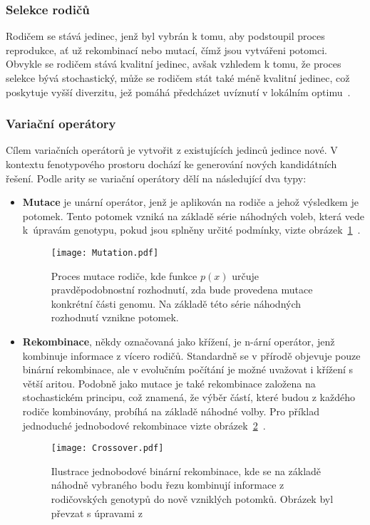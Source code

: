 \subsubsection*{Selekce rodičů}
Rodičem se stává jedinec, jenž byl vybrán k tomu, aby podstoupil proces reprodukce, ať už rekombinací nebo mutací, čímž jsou vytvářeni potomci. 
Obvykle se rodičem stává kvalitní jedinec, avšak vzhledem k tomu, že proces selekce bývá stochastický, může se rodičem stát také méně kvalitní jedinec, což poskytuje vyšší diverzitu, jež pomáhá předcházet uvíznutí v lokálním optimu~\cite{IntroductionToEvoComputing}. 

\subsubsection*{Variační operátory}
Cílem variačních operátorů je vytvořit z existujících jedinců jedince nové. 
V kontextu fenotypového prostoru dochází ke generování nových kandidátních řešení. 
Podle arity se variační operátory dělí na následující dva typy:
\begin{itemize}
    \item \textbf{Mutace} je unární operátor, jenž je aplikován na rodiče a jehož výsledkem je potomek. 
        Tento potomek vzniká na základě série náhodných voleb, která vede k~úpravám genotypu, pokud jsou splněny určité podmínky, vizte obrázek~\ref{fig:mutation}~\cite{IntroductionToEvoComputing,NaturalComputing}. 
        \begin{figure}[ht!]
            \centering
            \texttt{[image: Mutation.pdf]}
            \caption{Proces mutace rodiče, kde funkce $p\left(x\right)$ určuje pravděpodobnostní rozhodnutí, zda bude provedena mutace konkrétní části genomu. Na základě této série náhodných rozhodnutí vznikne potomek.}
            \label{fig:mutation}
        \end{figure}
    \item \textbf{Rekombinace}, někdy označovaná jako křížení, je n-ární operátor, jenž kombinuje informace z vícero rodičů. 
        Standardně se v přírodě objevuje pouze binární rekombinace, ale v evolučním počítání je možné uvažovat i křížení s větší aritou. 
        Podobně jako mutace je také rekombinace založena na stochastickém principu, což znamená, že výběr částí, které budou z každého rodiče kombinovány, probíhá na základě náhodné volby. 
        Pro příklad jednoduché jednobodové rekombinace vizte obrázek~\ref{fig:crossover}~\cite{IntroductionToEvoComputing}. 
        \begin{figure}[ht!]
            \centering
            \texttt{[image: Crossover.pdf]}
            \caption{Ilustrace jednobodové binární rekombinace, kde se na základě náhodně vybraného bodu řezu kombinují informace z rodičovských genotypů do nově vzniklých potomků. Obrázek byl převzat s úpravami z~\cite{NaturalComputing}}
            \label{fig:crossover}
        \end{figure}
\end{itemize}
